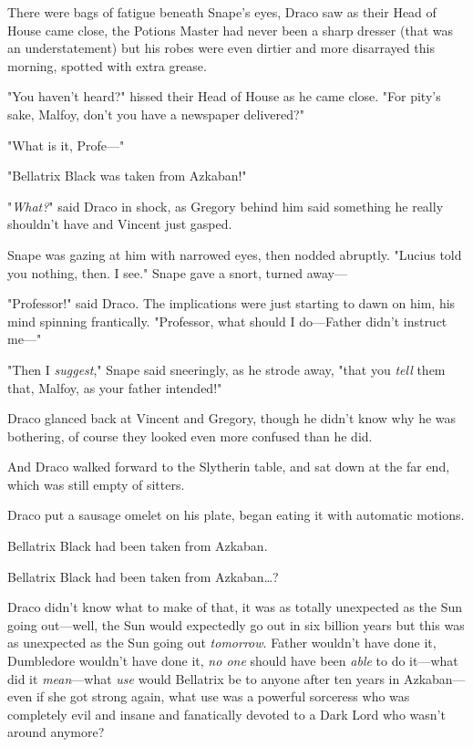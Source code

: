 There were bags of fatigue beneath Snape's eyes, Draco saw as their Head of 
House came close, the Potions Master had never been a sharp dresser (that was 
an understatement) but his robes were even dirtier and more disarrayed this 
morning, spotted with extra grease.

"You haven't heard?" hissed their Head of House as he came close. "For pity's 
sake, Malfoy, don't you have a newspaper delivered?"

"What is it, Profe---"

"Bellatrix Black was taken from Azkaban!"

"\emph{What?}" said Draco in shock, as Gregory behind him said something he 
really shouldn't have and Vincent just gasped.

Snape was gazing at him with narrowed eyes, then nodded abruptly. "Lucius told 
you nothing, then. I see." Snape gave a snort, turned away---

"Professor!" said Draco. The implications were just starting to dawn on him, 
his mind spinning frantically. "Professor, what should I do---Father didn't 
instruct me---"

"Then I \emph{suggest}," Snape said sneeringly, as he strode away, "that you 
\emph{tell} them that, Malfoy, as your father intended!"

Draco glanced back at Vincent and Gregory, though he didn't know why he was 
bothering, of course they looked even more confused than he did.

And Draco walked forward to the Slytherin table, and sat down at the far end, 
which was still empty of sitters.

Draco put a sausage omelet on his plate, began eating it with automatic motions.

Bellatrix Black had been taken from Azkaban.

Bellatrix Black had been taken from Azkaban{\ldots}?

Draco didn't know what to make of that, it was as totally unexpected as the Sun 
going out---well, the Sun would expectedly go out in six billion years but this 
was as unexpected as the Sun going out \emph{tomorrow}. Father wouldn't have 
done it, Dumbledore wouldn't have done it, \emph{no one} should have been 
\emph{able} to do it---what did it \emph{mean}---what \emph{use} would 
Bellatrix be to anyone after ten years in Azkaban---even if she got strong 
again, what use was a powerful sorceress who was completely evil and insane and 
fanatically devoted to a Dark Lord who wasn't around anymore?

